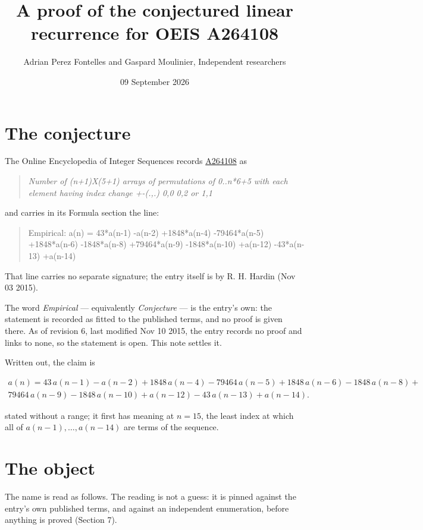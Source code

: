 \documentclass[11pt]{article}
\title{A proof of the conjectured linear recurrence for OEIS A264108}
\author{Adrian Perez Fontelles and Gaspard Moulinier, Independent researchers}
\date{09 September 2026}
\theoremstyle{definition}
\begin{document}
\maketitle
\section{The conjecture}

The Online Encyclopedia of Integer Sequences records \href{https://oeis.org/A264108}{A264108} as

\begin{quote}\itshape Number of (n+1)X(5+1) arrays of permutations of 0..n*6+5 with each element having index change +-(.,.) 0,0 0,2 or 1,1\end{quote}

and carries in its Formula section the line:

\begin{quote}\ttfamily Empirical: a(n) = 43*a(n-1) -a(n-2) +1848*a(n-4) -79464*a(n-5) +1848*a(n-6) -1848*a(n-8) +79464*a(n-9) -1848*a(n-10) +a(n-12) -43*a(n-13) +a(n-14)\end{quote}

That line carries no separate signature; the entry itself is by R. H. Hardin (Nov 03 2015).

The word {\itshape Empirical} --- equivalently {\itshape Conjecture} --- is the entry's own: the statement is recorded as fitted to the published terms, and no proof is given there. As of revision 6, last modified Nov 10 2015, the entry records no proof and links to none, so the statement is open. This note settles it.

Written out, the claim is

\begin{multline*} a(n) = 43\,a(n-1) - a(n-2) + 1848\,a(n-4) - 79464\,a(n-5) + 1848\,a(n-6) - 1848\,a(n-8) + \\ 79464\,a(n-9) - 1848\,a(n-10) + a(n-12) - 43\,a(n-13) + a(n-14). \end{multline*}

stated without a range; it first has meaning at $n = 15$, the least index at which all of $a(n-1),\dots,a(n-14)$ are terms of the sequence.

\section{The object}

The name is read as follows. The reading is not a guess: it is pinned against the entry's own published terms, and against an independent enumeration, before anything is proved (Section 7).
\end{document}
